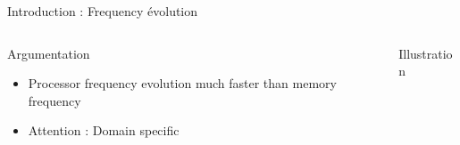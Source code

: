 \begin{Frame}{Introduction : Frequency évolution}
\begin{columns}[t]
\begin{column}{\BW}
\begin{block}{Argumentation}
\begin{itemize}
\item Processor frequency evolution much faster than memory frequency
\item Attention : Domain specific
\end{itemize}

\end{block}

\end{column}
\begin{column}{\BW}
\begin{block}{Illustration}
\end{block}

\end{column}

\end{columns}

\end{Frame}

